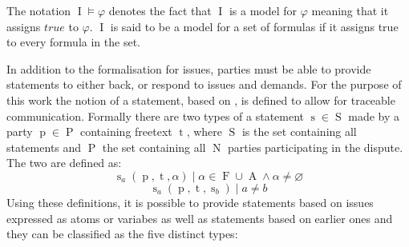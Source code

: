 \documentclass[12pt,msc,a4paper,oneside]{ucl_thesis}
\DeclareMathOperator{\Propatom}{A}
\DeclareMathOperator{\Propvar}{F}
\DeclareMathOperator{\Interpretation}{I}
\DeclareMathOperator{\Statement}{S}
\DeclareMathOperator{\statement}{s}
\DeclareMathOperator{\statementtext}{t}
\DeclareMathOperator{\Party}{P}
\DeclareMathOperator{\party}{p}
\DeclareMathOperator{\Numparties}{N}
\begin{document}
\begin{itemize}
        The notation $\Interpretation\models\varphi$ denotes the fact that $\Interpretation$ is a model for $\varphi$ meaning that it assigns $true$ to $\varphi$. $\Interpretation$ is said to be a model for a set of formulas if it assigns true to every formula in the set.
\end{itemize}
In addition to the formalisation for issues, parties must be able to provide statements to either back, or respond to issues and demands. For the purpose of this work the notion of a statement, based on \cite{Bellucci:2004:IAI:1032651.1033678}, is defined to allow for traceable communication. Formally there are two types of a statement $\statement \in \Statement$ made by a party $\party \in \Party$ containing freetext $\statementtext$, where $\Statement$ is the set containing all statements and $\Party$ the set containing all $\Numparties$ parties participating in the dispute. The two are defined as:
\begin{equation}
    \statement_a(\party, \statementtext, \alpha) \mid \alpha \in \Propvar \cup \Propatom \wedge \alpha \neq \varnothing
    \label{eq:initial_statement}
\end{equation}
\begin{equation}
    \statement_a(\party, \statementtext, \statement_b) \mid a \neq b
    \label{eq:initial_statement_s}
\end{equation}
Using these definitions, it is possible to provide statements based on issues expressed as atoms or variabes as well as statements based on earlier ones and they can be classified as the five distinct types:
\end{document}

